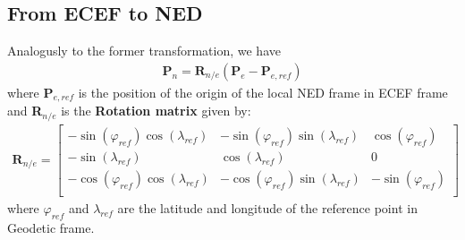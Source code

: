 \subsection*{From ECEF to NED}
Analogusly to the former transformation, we have
\begin{align}
\textbf{P}_{n} = \textbf{R}_{n/e}\left(\textbf{P}_{e} - \textbf{P}_{e,ref}\right)
\end{align}
where \textbf{P}$_{e,ref}$ is the position of the origin of the local NED frame in ECEF frame and \textbf{R}$_{n/e}$ is the \textbf{Rotation matrix} given by: 
\begin{align*}
\textbf{R}_{n/e} =
\begin{bmatrix}
-\sin(\varphi_{ref})\cos(\lambda_{ref}) & -\sin(\varphi_{ref})\sin(\lambda_{ref}) & \cos(\varphi_{ref})\\
-\sin(\lambda_{ref}) & \cos(\lambda_{ref}) & 0\\
-\cos(\varphi_{ref})\cos(\lambda_{ref}) & -\cos(\varphi_{ref})\sin(\lambda_{ref}) & -\sin(\varphi_{ref})\\
\end{bmatrix}
\end{align*}
where $\varphi_{ref}$ and $\lambda_{ref}$ are the latitude and longitude of the reference point in Geodetic frame.